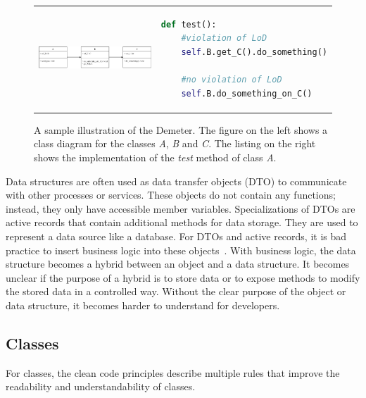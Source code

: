 \begin{figure}
\begin{tabular}{p{}p{}}
    \begin{minipage}{0.45\textwidth}
        \centering
    \includegraphics[width=\linewidth]{img/Background/LawOfDemeterUML.pdf}
    \label{fig:background_control_flow_graph_image}
    \end{minipage}
&
\begin{minipage}[c]{0.45\textwidth}
\centering
\begin{lstlisting}[language=Python, label=lst:background_control_flow_graph_listing]
def test():
    #violation of LoD
    self.B.get_C().do_something()

    #no violation of LoD
    self.B.do_something_on_C()
\end{lstlisting}
\end{minipage}
\end{tabular}
\caption{A sample illustration of the Demeter. The figure on the left shows a class diagram for the classes \textit{A}, \textit{B} and \textit{C}. The listing on the right shows the implementation of the \textit{test} method of class \textit{A}. }
\label{fig:LoD}
\end{figure}



Data structures are often used as data transfer objects (DTO) to communicate with other processes or services. These objects do not contain any functions; instead, they only have accessible member variables. Specializations of DTOs are active records that contain additional methods for data storage. They are used to represent a data source like a database. For DTOs and active records, it is bad practice to insert business logic into these objects~\cite{martin_clean_2009}. With business logic, the data structure becomes a hybrid between an object and a data structure. It becomes unclear if the purpose of a hybrid is to store data or to expose methods to modify the stored data in a controlled way. Without the clear purpose of the object or data structure, it becomes harder to understand for developers.


\subsection{Classes}\label{sec:classes}
For classes, the clean code principles describe multiple rules that improve the readability and understandability of classes.

